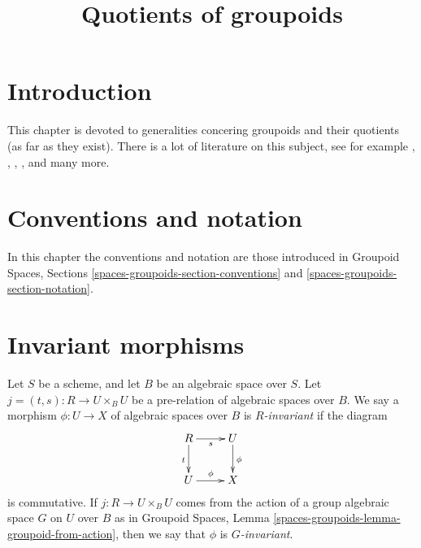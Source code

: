 

%


\title{Quotients of groupoids}


\maketitle

\label{section-phantom}

\tableofcontents

\section{Introduction}
\label{section-introduction}

\noindent
This chapter is devoted to generalities concering groupoids and their
quotients (as far as they exist).
There is a lot of literature on this subject, see for example
\cite{GIT}, \cite{seshadri_quotients}, \cite{KollarQuotients},
\cite{K-M}, \cite{KollarFinite} and many more.





\section{Conventions and notation}
\label{section-conventions-notation}

\noindent
In this chapter the conventions and notation are those introduced in
Groupoid Spaces, Sections \ref{spaces-groupoids-section-conventions}
and \ref{spaces-groupoids-section-notation}.


\section{Invariant morphisms}
\label{section-invariant}

\begin{definition}
\label{definition-invariant}
Let $S$ be a scheme, and let $B$ be an algebraic space over $S$.
Let $j = (t, s) : R \to U \times_B U$ be a pre-relation of algebraic
spaces over $B$. We say a morphism $\phi : U \to X$ of algebraic spaces
over $B$ is {\it $R$-invariant} if the diagram
$$
\xymatrix{
R \ar[r]_s \ar[d]_t & U \ar[d]^\phi \\
U \ar[r]^\phi & X
}
$$
is commutative. If $j : R \to U \times_B U$ comes from the action
of a group algebraic space $G$ on $U$ over $B$ as in
Groupoid Spaces, Lemma \ref{spaces-groupoids-lemma-groupoid-from-action},
then we say that $\phi$ is {\it $G$-invariant}.
\end{definition}

